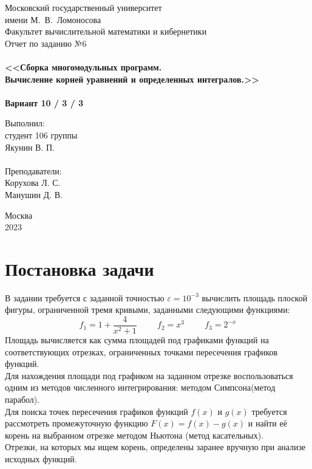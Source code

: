\documentclass[a4paper,12pt,titlepage,finall]{article}
\begin{document}
\begin{titlepage}
    \begin{center}
	{\small \sc Московский государственный университет \\имени М.~В.~Ломоносова\\
	Факультет вычислительной математики и кибернетики\\}
	\vfill
	{\Large \sc Отчет по заданию №6}\\
	~\\
	{\large \bf <<Сборка многомодульных программ. \\
	Вычисление корней уравнений и определенных интегралов.>>}\\ 
	~\\
	{\large \bf Вариант 10 / 3 / 3}
    \end{center}
    \begin{flushright}
	\vfill {Выполнил:\\
	студент 106 группы\\
	Якунин В. П.\\
	~\\
	Преподаватели:\\
	Корухова Л. С.\\
    Манушин Д. В.}
    \end{flushright}
    \begin{center}
	\vfill
	{\small Москва\\2023}
    \end{center}
\end{titlepage}

\tableofcontents
\newpage

\section{Постановка задачи}

В задании требуется с заданной точностью $\varepsilon = 10^{-3}$ вычислить площадь плоской фигуры, ограниченной тремя кривыми, заданными следующими функциями:
\[
f_1 = 1 + \frac{4}{x^2 + 1} \hspace{1cm}
f_2 = x^3 \hspace{1cm}
f_3 = 2^{-x}
\]
Площадь вычисляется как сумма площадей под графиками функций на соответствующих отрезках, ограниченных точками пересечения графиков функций.\\ Для нахождения площади под графиком на заданном отрезке воспользоваться одним из методов численного интегрирования: методом Симпсона(метод парабол).\\ Для поиска точек пересечения графиков функций $f(x)$ и $g(x)$ требуется рассмотреть промежуточную функцию $F(x) = f(x) - g(x)$ и найти её корень на выбранном отрезке методом Ньютона (метод касательных).\\ Отрезки, на которых мы ищем корень, определены заранее вручную при анализе исходных функций.
\end{document}
